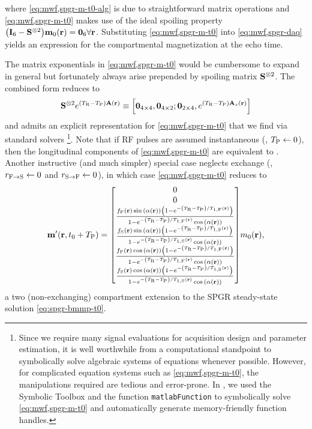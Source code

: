 where \eqref{eq:mwf,spgr-m-t0-alg} is due
to straightforward matrix operations
and \eqref{eq:mwf,spgr-m-t0} makes use 
of the ideal spoiling property
$\paren{\eye{6}-\bmSsix}\bmmzero\pr = \zeros{6}\xspace \forall\bmr$.
Substituting \eqref{eq:mwf,spgr-m-t0}
into \eqref{eq:mwf,spgr-daq}
yields an expression
for the compartmental magnetization 
at the echo time.

The matrix exponentials 
in \eqref{eq:mwf,spgr-m-t0} 
would be cumbersome to expand in general
but fortunately always arise
prepended by spoiling matrix $\mathbf{S}^{\otimes2}$.
The combined form reduces to
\begin{align}
	\bmSsix e^{\paren{\TR-\TP}\bmA\pr} \equiv
		\brac{\zeros{4 \times 4}, \zeros{4 \times 2}; 
		\zeros{2 \times 4}, e^{\paren{\TR-\TP} \bmAz\pr}}
	\label{eq:mwf,spgr-spoil-simp}
\end{align}
and admits 
an explicit representation 
for \eqref{eq:mwf,spgr-m-t0}
that we find
via standard solvers
\footnote{%
	Since we require many signal evaluations
	for acquisition design
	and parameter estimation,
	it is well worthwhile 
	from a computational standpoint
	to symbolically solve
	algebraic systems of equations
	whenever possible.
	However, 
	for complicated equation systems 
	such as \eqref{eq:mwf,spgr-m-t0}, 
	the manipulations required 
	are tedious and error-prone.
	In \matlab,
	we used the Symbolic Toolbox 
	and the function \texttt{matlabFunction}
	to symbolically solve \eqref{eq:mwf,spgr-m-t0}
	and automatically generate 
	memory-friendly function handles. 
}. 
Note that
if RF pulses are assumed instantaneous
(\ie, $T_\mathrm{P} \gets 0$),
then the longitudinal components
of \eqref{eq:mwf,spgr-m-t0}
are equivalent to \cite[Eq.~34]{spencer:00:mos}.
Another instructive (and much simpler) special case
neglects exchange
(\ie, $r_{\mathrm{F}\to\mathrm{S}} \gets 0$ and $r_{\mathrm{S}\to\mathrm{F}} \gets 0$),
in which case \eqref{eq:mwf,spgr-m-t0} reduces to
\begin{align}
	\bmmp\paren{\bmr,t_0+\TP} =
	\begin{bmatrix}
		0 \\
		0 \\
		\frac{\ff\pr \sina{\flip\pr}\paren{1-e^{-\paren{\TR-\TP}/\tf{1}\pr}}}
			{1-e^{-\paren{\TR-\TP}/\tf{1}\pr}\cosa{\flip\pr}} \\
		\frac{\fs\pr \sina{\flip\pr}\paren{1-e^{-\paren{\TR-\TP}/\ts{1}\pr}}}
			{1-e^{-\paren{\TR-\TP}/\ts{1}\pr}\cosa{\flip\pr}} \\
		\frac{\ff\pr \cosa{\flip\pr}\paren{1-e^{-\paren{\TR-\TP}/\tf{1}\pr}}}
			{1-e^{-\paren{\TR-\TP}/\tf{1}\pr}\cosa{\flip\pr}} \\
		\frac{\fs\pr \cosa{\flip\pr}\paren{1-e^{-\paren{\TR-\TP}/\ts{1}\pr}}}
			{1-e^{-\paren{\TR-\TP}/\ts{1}\pr}\cosa{\flip\pr}}
	\end{bmatrix}
	\mzero\pr,
	\label{eq:mwf-spgr-m-t0-exchg0}
\end{align}
a two (non-exchanging) compartment extension
to the SPGR steady-state solution \eqref{eq:spgr-bmmp-t0}.


